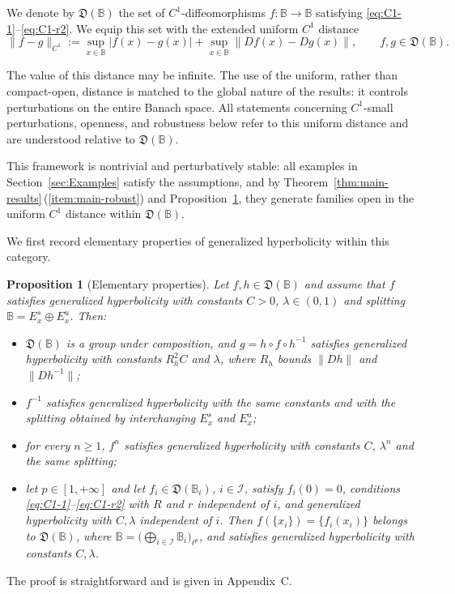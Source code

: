\documentclass[12pt]{article}
\newcommand{\Bb}{\mathbb{B}}
\newcommand{\DUC}{\mathfrak{D}}
\newtheorem{statement}[thm]{Proposition}
\theoremstyle{definition}
\begin{document}
We denote by $\DUC(\Bb)$ the set of $C^1$-diffeomorphisms $f:\Bb\to\Bb$ satisfying \eqref{eq:C1-1}--\eqref{eq:C1-r2}. 
We equip this set with the extended uniform $C^1$ distance
$$
\|f-g\|_{C^1}
:=
\sup_{x\in\Bb}|f(x)-g(x)|
+
\sup_{x\in\Bb}\|Df(x)-Dg(x)\|,
\qquad f,g\in\DUC(\Bb).
$$

The value of this distance may be infinite. 
The use of the uniform, rather than compact-open, distance is matched to the global nature of the results: it controls perturbations on the entire Banach space. 
All statements concerning $C^1$-small perturbations, openness, and robustness below refer to this uniform distance and are understood relative to $\DUC(\Bb)$.

This framework is nontrivial and perturbatively stable: all examples in Section~\ref{sec:Examples} satisfy the assumptions, and by Theorem~\ref{thm:main-results}\,(\ref{item:main-robust}) and Proposition~\ref{stat:difconj}, they generate families open in the uniform $C^1$ distance within $\DUC(\Bb)$.

We first record elementary properties of generalized hyperbolicity within this category.

\begin{statement}[Elementary properties]\label{stat:difconj}
Let $f, h \in \DUC(\Bb)$ and assume that $f$ satisfies generalized hyperbolicity with constants $C>0$, $\lambda \in (0,1)$ and splitting $\Bb = E^s_x \oplus E^u_x$. 
Then:
\begin{itemize}
\item[(P1)] $\DUC(\Bb)$ is a group under composition, and $g = h \circ f \circ h^{-1}$
satisfies generalized hyperbolicity with constants $R_h^2 C$ and $\lambda$, where $R_h$ bounds $\|Dh\|$ and $\|Dh^{-1}\|$;
\item[(P2)] $f^{-1}$ satisfies generalized hyperbolicity with the same constants and with the splitting obtained by interchanging $E^s_x$ and $E^u_x$;
\item[(P3)] for every $n \geq 1$, $f^n$ satisfies generalized hyperbolicity with constants $C$, $\lambda^n$ and the same splitting;
\item[(P4)] let $p \in [1,+\infty]$ and let $f_i \in \DUC(\Bb_i)$, $i \in \mathcal I$,
satisfy $f_i(0) = 0$, conditions \eqref{eq:C1-1}--\eqref{eq:C1-r2} with $R$ and $r$ independent of $i$, and generalized hyperbolicity with $C, \lambda$ independent of $i$.
Then $f(\{x_i\}) = \{f_i(x_i)\}$ belongs to $\DUC(\Bb)$, where
$\Bb = \bigl(\bigoplus_{i \in \mathcal I} \Bb_i\bigr)_{\ell^p}$, and satisfies generalized hyperbolicity with constants $C, \lambda$.
\end{itemize}
\end{statement}
The proof is straightforward and is given in Appendix~C.
\end{document}
